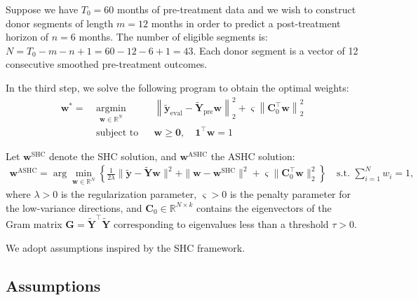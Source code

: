 \documentclass{article}
\begin{document}
\begin{example}
Suppose we have $T_0 = 60$ months of pre-treatment data and we wish to construct donor segments of length $m = 12$ months in order to predict a post-treatment horizon of $n = 6$ months. The number of eligible segments is: $N = T_0 - m - n + 1 = 60 - 12 - 6 + 1 = 43.$ Each donor segment is a vector of 12 consecutive smoothed pre-treatment outcomes.
\end{example}
In the third step, we solve the following program to obtain the optimal weights:
\begin{equation}
\label{eq:weight_qp_explicit}
\begin{aligned}
\mathbf{w}^\ast = \ & \underset{\mathbf{w} \in \mathbb{R}^N}{\operatorname*{argmin}} 
& & \left\| \widetilde{\mathbf{y}}_{\text{eval}} - \widetilde{\mathbf{Y}}_{\text{pre}} \mathbf{w} \right\|_2^2 
+ \varsigma \left\| \mathbf{C}_0^\top \mathbf{w} \right\|_2^2 \\
& \text{subject to}
& & \mathbf{w} \geq \mathbf{0}, \quad \mathbf{1}^\top \mathbf{w} = 1
\end{aligned}
\end{equation}

Let $\mathbf{w}^{\text{SHC}}$ denote the SHC solution, and $\mathbf{w}^{\text{ASHC}}$
the ASHC solution:
\begin{align*}
\mathbf{w}^{\text{ASHC}}
= \arg\min_{\mathbf{w} \in \mathbb{R}^N}
\left\{
\frac{1}{2\lambda} \|\widetilde{\mathbf{y}} - \widetilde{\mathbf{Y}} \mathbf{w}\|^2
+ \|\mathbf{w} - \mathbf{w}^{\text{SHC}}\|^2
+ \varsigma \|\mathbf{C}_0^\top \mathbf{w}\|_2^2
\right\}
\quad \text{s.t. } \sum_{i=1}^N w_i = 1,
\end{align*}
where $\lambda > 0$ is the regularization parameter, $\varsigma > 0$ is the penalty parameter for the low-variance directions, and $\mathbf{C}_0 \in \mathbb{R}^{N \times k}$ contains the eigenvectors of the Gram matrix $\mathbf{G} = \widetilde{\mathbf{Y}}^\top \widetilde{\mathbf{Y}}$ corresponding to eigenvalues less than a threshold $\tau > 0$.

We adopt assumptions inspired by the SHC framework.

\subsection*{Assumptions}
\end{document}

